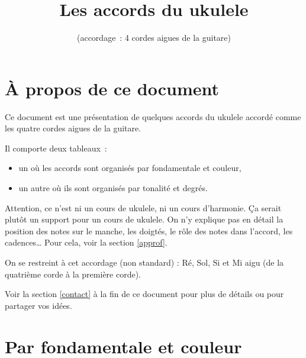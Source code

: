 \documentclass[11pt]{article}
\title{\vspace{-5em}Les accords du ukulele}
\author{(accordage : 4 cordes aigues de la guitare)}
\date{}
\begin{document}
\maketitle

\setcounter{tocdepth}{2}
\tableofcontents

\section{À propos de ce document}

Ce document est une présentation de quelques accords du ukulele accordé comme
les quatre cordes aigues de la guitare.

Il comporte deux tableaux :

\begin{itemize}
\item un où les accords sont organisés par fondamentale et couleur,
\item un autre où ils sont organisés par tonalité et degrés.
\end{itemize}

Attention, ce n’est ni un cours de ukulele, ni un cours d’harmonie.
Ça serait plutôt un support pour un cours de ukulele. On n’y explique pas en
détail la position des notes sur le manche, les doigtés, le rôle des notes dans
l’accord, les cadences… Pour cela, voir la section \ref{approf}.

On se restreint à cet accordage (non standard) : Ré, Sol, Si et Mi aigu
(de la quatrième corde à la première corde).

Voir la section \ref{contact} à la fin de ce document pour plus de détails ou
pour partager vos idées.

\section{Par fondamentale et couleur}
\end{document}
